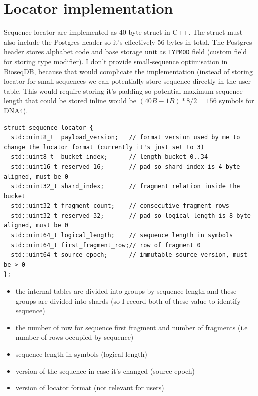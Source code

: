 \section{Locator implementation}
\label{sec:pg-storage-sequence-indirection}

Sequence locator are implemented as 40-byte struct in C++. The struct must also include the Postgres header so it's effectively 56 bytes in total.
The Postgres header stores alphabet code and base storage unit as \texttt{TYPMOD} field (custom field for storing type modifier).
I don't provide small-sequence optimisation in BioseqDB, because that would complicate the implementation (instead of storing locator for small sequences we can potentially 
store sequence directly in the user table. This would require storing it's padding so potential maximum sequence length that could be stored inline would be $(40B - 1B)*8/2 = 156$ symbols for DNA4).

\begin{minipage}{\linewidth}
\begin{lstlisting}[style=bioseq-cpp26,numbers=none,
  basicstyle=\footnotesize\ttfamily,
  caption={The 40-byte locator stored after the 16-byte sequence header.},
  label={lst:storage-sequence-locator}]
struct sequence_locator {
  std::uint8_t  payload_version;   // format version used by me to change the locator format (currently it's just set to 3)
  std::uint8_t  bucket_index;      // length bucket 0..34
  std::uint16_t reserved_16;       // pad so shard_index is 4-byte aligned, must be 0
  std::uint32_t shard_index;       // fragment relation inside the bucket
  std::uint32_t fragment_count;    // consecutive fragment rows
  std::uint32_t reserved_32;       // pad so logical_length is 8-byte aligned, must be 0
  std::uint64_t logical_length;    // sequence length in symbols
  std::uint64_t first_fragment_row;// row of fragment 0
  std::uint64_t source_epoch;      // immutable source version, must be > 0
};
\end{lstlisting}
\end{minipage}

\begin{itemize}
  \item the internal tables are divided into groups by sequence length and these groups are divided into shards (so I record both of these value to identify sequence)
  \item the number of row for sequence first fragment and number of fragments (i.e number of rows occupied by sequence)
  \item sequence length in symbols (logical length)
  \item version of the sequence in case it's changed (source epoch)
  \item version of locator format (not relevant for users)
\end{itemize}


